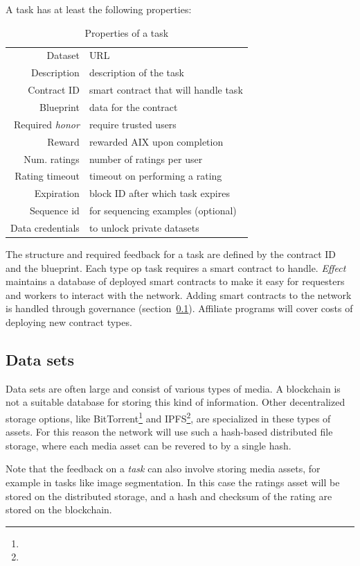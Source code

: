 \documentclass{article}
\begin{document}
A task has at least the following properties:

\begin{table}[h]
  \centering
  \begin{tabular}[h]{r|l}
    Dataset & URL \\
    Description & description of the task \\ 
    Contract ID & smart contract that will handle task \\
    Blueprint & data for the contract \\ 
    Required \emph{honor} & require trusted users \\
    Reward & rewarded AIX upon completion \\
    Num. ratings & number of ratings per user \\
    Rating timeout & timeout on performing a rating \\ 
    Expiration  & block ID after which task expires \\
    Sequence id & for sequencing examples (optional)\\
    Data credentials & to unlock private datasets \\
  \end{tabular}
  \caption{Properties of a task}
  \label{tab:task}
\end{table}

The structure and required feedback for a task are defined by the
contract ID and the blueprint. Each type op task requires a smart
contract to handle. \emph{Effect} maintains a database of deployed
smart contracts to make it easy for requesters and workers to interact
with the network. Adding smart contracts to the network is handled
through governance (section~\ref{}). Affiliate programs
will cover costs of deploying new contract types. 

\subsection{Data sets}
Data sets are often large and consist of various types of media. A
blockchain is not a suitable database for storing this kind of
information. Other decentralized storage options, like
BitTorrent\footnote{} and IPFS\footnote{}, are specialized in these
types of assets. For this reason the network will use such a
hash-based distributed file storage, where each media asset can be
revered to by a single hash.

Note that the feedback on a \emph{task} can also involve storing media
assets, for example in tasks like image segmentation. In this case the
ratings asset will be stored on the distributed storage, and a hash
and checksum of the rating are stored on the blockchain.
\end{document}
